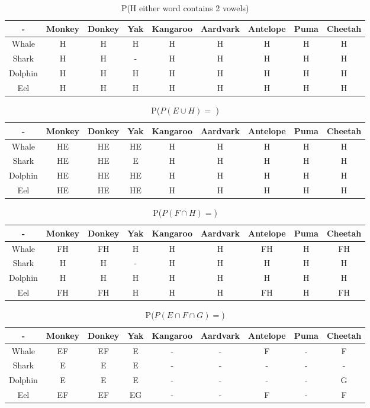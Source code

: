 \documentclass[11pt]{article}
\begin{document}
\begin{table}
\caption{P(H either word contains 2 vowels)}
  \begin{tabular}{|c|cccccccc|}
  	\hline
    - & Monkey & Donkey & Yak & Kangaroo & Aardvark & Antelope & Puma & Cheetah\\
    \hline
    Whale & H & H & H & H & H & H & H & H\\
    Shark & H & H & - & H & H & H & H & H\\
    Dolphin & H & H & H & H & H & H & H & H\\
    Eel & H & H & H & H & H & H & H & H\\
    \hline
  \end{tabular}
\end{table}
\begin{table}
\caption{P($ P(E\cup H)= $ )}
  \begin{tabular}{|c|cccccccc|}
  	\hline
    - & Monkey & Donkey & Yak & Kangaroo & Aardvark & Antelope & Puma & Cheetah\\
    \hline
    Whale & HE & HE & HE & H & H & H & H & H\\
    Shark & HE & HE & E & H & H & H & H & H\\
    Dolphin & HE & HE & HE & H & H & H & H & H\\
    Eel & HE & HE & HE & H & H & H & H & H\\
    \hline
  \end{tabular}
\end{table}
\begin{table}
\caption{P($ P(F\cap H)= $)}
  \begin{tabular}{|c|cccccccc|}
  	\hline
    - & Monkey & Donkey & Yak & Kangaroo & Aardvark & Antelope & Puma & Cheetah\\
    \hline
    Whale & FH & FH & H & H & H & FH & H & FH\\
    Shark & H & H & - & H & H & H & H & H\\
    Dolphin & H & H & H & H & H & H & H & H\\
    Eel & FH & FH & H & H & H & FH & H & FH\\
    \hline
  \end{tabular}
\end{table}
\begin{table}
\caption{P($ P(E\cap F\cap G)= $)}
  \begin{tabular}{|c|cccccccc|}
  	\hline
    - & Monkey & Donkey & Yak & Kangaroo & Aardvark & Antelope & Puma & Cheetah\\
    \hline
    Whale & EF & EF & E & - & - & F & - & F\\
    Shark & E & E & E & - & - & - & - & -\\
    Dolphin & E & E & E & - & - & - & - & G\\
    Eel & EF & EF & EG & - & - & F & - & F\\
    \hline
  \end{tabular}
\end{table}
\end{document}

